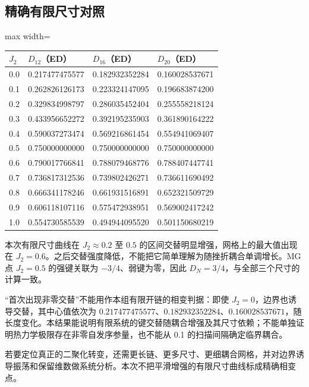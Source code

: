 \documentclass[zihao=5,a4paper]{ctexart}
\begin{document}
\subsection{\texorpdfstring{精确有限尺寸对照}{精确有限尺寸对照}}

\begin{center}
\small
\begin{adjustbox}{max width=\linewidth}
\begin{tabular}{llll}
\toprule
$J_2$ & $D_{12}$（ED） & $D_{16}$（ED） & $D_{20}$（ED） \\
\midrule
0.0 & 0.217477475577 & 0.182932352284 & 0.160028537671 \\
0.1 & 0.262826126173 & 0.223324147095 & 0.196683874200 \\
0.2 & 0.329834998797 & 0.286035452404 & 0.255558218124 \\
0.3 & 0.433956652272 & 0.392195235903 & 0.361890164222 \\
0.4 & 0.590037273474 & 0.569216861454 & 0.554941069407 \\
0.5 & 0.750000000000 & 0.750000000000 & 0.750000000000 \\
0.6 & 0.790017766841 & 0.788079468776 & 0.788407447741 \\
0.7 & 0.736817312536 & 0.739802426271 & 0.736611690492 \\
0.8 & 0.666341178246 & 0.661931516891 & 0.652321509729 \\
0.9 & 0.606118107116 & 0.575472938951 & 0.569002417242 \\
1.0 & 0.554730585539 & 0.494944095520 & 0.501150680219 \\
\bottomrule
\end{tabular}
\end{adjustbox}
\end{center}

本次有限尺寸曲线在 $J_2\approx0.2$ 至 $0.5$ 的区间交替明显增强，网格上的最大值出现在 $J_2=0.6$。之后交替强度降低，不能把它简单理解为随挫折耦合单调增长。MG 点 $J_2=0.5$ 的强键关联为 $-3/4$、弱键为零，因此 $D_N=3/4$，与全部三个尺寸的计算一致。


“首次出现非零交替”不能用作本组有限开链的相变判据：即使 $J_2=0$，边界也诱导交替，其中心值依次为 $0.217477475577$、$0.182932352284$、$0.160028537671$，随长度变化。本结果能说明有限系统的键交替随耦合增强及其尺寸依赖；不能单独证明热力学极限存在非零自发序参量，也不能从 0.1 的扫描间隔确定临界耦合。


若要定位真正的二聚化转变，还需更长链、更多尺寸、更细耦合网格，并对边界诱导振荡和保留维数做系统分析。本次不把平滑增强的有限尺寸曲线标成精确相变点。
\end{document}
